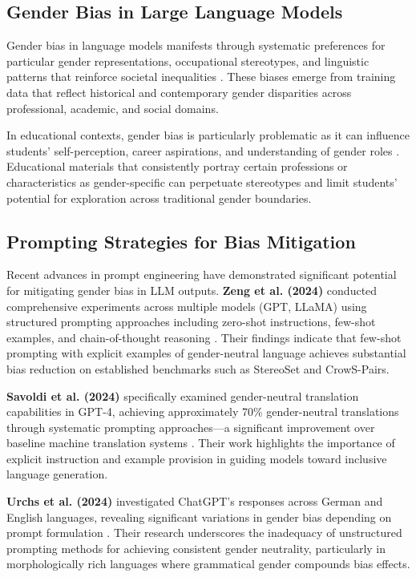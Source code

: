 \subsection{Gender Bias in Large Language Models}

Gender bias in language models manifests through systematic preferences for particular gender representations, occupational stereotypes, and linguistic patterns that reinforce societal inequalities \cite{zhao2024multilangbias}. These biases emerge from training data that reflect historical and contemporary gender disparities across professional, academic, and social domains.

In educational contexts, gender bias is particularly problematic as it can influence students' self-perception, career aspirations, and understanding of gender roles \cite{urchs2024chatgptbias}. Educational materials that consistently portray certain professions or characteristics as gender-specific can perpetuate stereotypes and limit students' potential for exploration across traditional gender boundaries.

\subsection{Prompting Strategies for Bias Mitigation}

Recent advances in prompt engineering have demonstrated significant potential for mitigating gender bias in LLM outputs. \textbf{Zeng et al. (2024)} conducted comprehensive experiments across multiple models (GPT, LLaMA) using structured prompting approaches including zero-shot instructions, few-shot examples, and chain-of-thought reasoning \cite{zeng2024debiasprompting}. Their findings indicate that few-shot prompting with explicit examples of gender-neutral language achieves substantial bias reduction on established benchmarks such as StereoSet and CrowS-Pairs.

\textbf{Savoldi et al. (2024)} specifically examined gender-neutral translation capabilities in GPT-4, achieving approximately 70\% gender-neutral translations through systematic prompting approaches—a significant improvement over baseline machine translation systems \cite{savoldi2024neutraltranslation}. Their work highlights the importance of explicit instruction and example provision in guiding models toward inclusive language generation.

\textbf{Urchs et al. (2024)} investigated ChatGPT's responses across German and English languages, revealing significant variations in gender bias depending on prompt formulation \cite{urchs2024chatgptbias}. Their research underscores the inadequacy of unstructured prompting methods for achieving consistent gender neutrality, particularly in morphologically rich languages where grammatical gender compounds bias effects.

